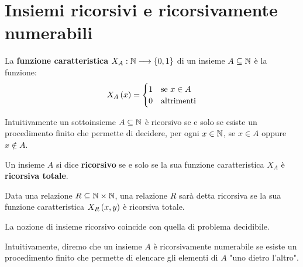 \documentclass{lectures}
\begin{document}
\chapter{Insiemi ricorsivi e ricorsivamente numerabili}
\begin{multicols}{2}
\begin{definition}
    La \textbf{funzione caratteristica} \(X_A:\mathbb{N}\longrightarrow \left\{0,1\right\}\) di un insieme \(A \subseteq \mathbb{N}\) è la funzione:
    \[
        X_A\left(x\right) = \begin{cases}
            1 & \text{se } x \in A\\
            0 & \text{altrimenti}
        \end{cases}
    \]
\end{definition}
\begin{definition}
    Intuitivamente un sottoinsieme \(A\subseteq \mathbb{N}\) è ricorsivo se e solo se esiste un procedimento finito che permette di decidere, per ogni \(x \in \mathbb{N}\), se \(x \in A\) oppure \(x \not\in A\).
    
    Un insieme \(A\) si dice \textbf{ricorsivo} se e solo se la sua funzione caratteristica \(X_A\) è \textbf{ricorsiva totale}.
\end{definition}
\begin{definition}
    Data una relazione \(R \subseteq \mathbb{N} \times \mathbb{N}\), una relazione \(R\) sarà detta ricorsiva se la sua funzione caratteristica \(X_R\left(x,y\right)\) è ricorsiva totale.
\end{definition}
\begin{observation}
    La nozione di insieme ricorsivo coincide con quella di problema decidibile.
\end{observation}
\begin{definition}
    Intuitivamente, diremo che un insieme \(A\) è ricorsivamente numerabile se esiste un procedimento finito che permette di elencare gli elementi di \(A\) "uno dietro l'altro".
    

\end{definition}
\end{multicols}
\end{document}
